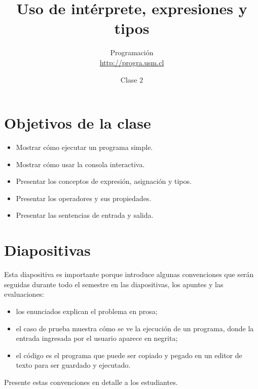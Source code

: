 \documentclass[10pt]{article}
\title{Uso de intérprete, expresiones y tipos}
\author{Programación \\ \url{http://progra.usm.cl}}
\date{Clase 2}
\begin{document}
  \maketitle

  \section*{Objetivos de la clase}
  \begin{itemize}
    \item Mostrar cómo ejecutar un programa simple.
    \item Mostrar cómo usar la consola interactiva.
    \item Presentar los conceptos de expresión, asignación y tipos.
    \item Presentar los operadores y sus propiedades.
    \item Presentar las sentencias de entrada y salida.
  \end{itemize}

  \section*{Diapositivas}


  Esta diapositiva es importante
  porque introduce algunas convenciones
  que serán seguidas durante todo el semestre
  en las diapositivas, los apuntes y las evaluaciones:
  \begin{itemize}
    \item los enunciados explican el problema en prosa;
    \item el caso de prueba muestra cómo se ve la ejecución de un programa,
      donde la entrada ingresada por el usuario aparece en negrita;
    \item el código es el programa que puede ser copiado y pegado
      en un editor de texto para ser guardado y ejecutado.
  \end{itemize}
  Presente estas convenciones en detalle a los estudiantes.
\end{document}
